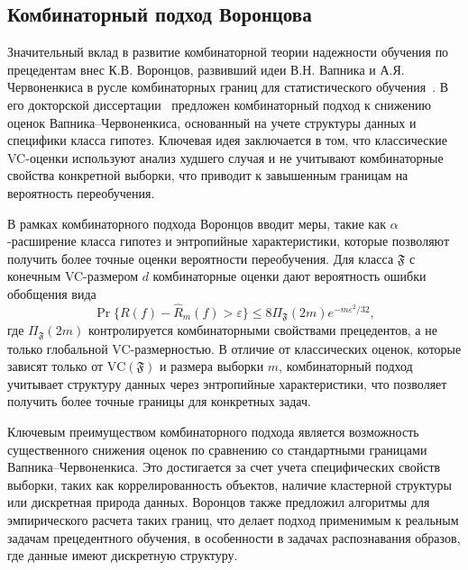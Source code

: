 \subsection{Комбинаторный подход Воронцова}

Значительный вклад в развитие комбинаторной теории надежности обучения по прецедентам внес К.В. Воронцов, развивший идеи В.Н. Вапника и А.Я. Червоненкиса в русле комбинаторных границ для статистического обучения~\cite{vorontsov04qualdan}. В его докторской диссертации~\cite[раздел~2]{vorontsov2010doctoral} предложен комбинаторный подход к снижению оценок Вапника--Червоненкиса, основанный на учете структуры данных и специфики класса гипотез. Ключевая идея заключается в том, что классические VC-оценки используют анализ худшего случая и не учитывают комбинаторные свойства конкретной выборки, что приводит к завышенным границам на вероятность переобучения.

В рамках комбинаторного подхода Воронцов вводит меры, такие как $\alpha$-расширение класса гипотез и энтропийные характеристики, которые позволяют получить более точные оценки вероятности переобучения. Для класса $\mathfrak{F}$ с конечным VC-размером $d$ комбинаторные оценки дают вероятность ошибки обобщения вида~\cite[раздел~1.5]{vorontsov2010doctoral}
\[
\Pr\{R(f) - \hat{R}_m(f) > \varepsilon\} \leq 8 \Pi_{\mathfrak{F}}(2m) e^{-m \varepsilon^2 / 32},
\]
где $\Pi_{\mathfrak{F}}(2m)$ контролируется комбинаторными свойствами прецедентов, а не только глобальной VC-размерностью. В отличие от классических оценок, которые зависят только от $\mathrm{VC}(\mathfrak{F})$ и размера выборки $m$, комбинаторный подход учитывает структуру данных через энтропийные характеристики, что позволяет получить более точные границы для конкретных задач.

Ключевым преимуществом комбинаторного подхода является возможность существенного снижения оценок по сравнению со стандартными границами Вапника--Червоненкиса. Это достигается за счет учета специфических свойств выборки, таких как коррелированность объектов, наличие кластерной структуры или дискретная природа данных. Воронцов также предложил алгоритмы для эмпирического расчета таких границ, что делает подход применимым к реальным задачам прецедентного обучения, в особенности в задачах распознавания образов, где данные имеют дискретную структуру.

